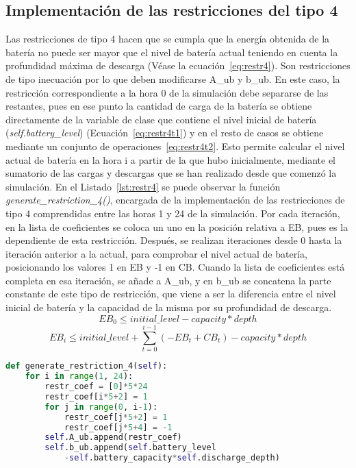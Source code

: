 \subsection{Implementación de las restricciones del tipo 4}
Las restricciones de tipo 4 hacen que se cumpla que la energía obtenida de la batería no puede ser mayor que el nivel de batería actual teniendo en cuenta la profundidad máxima de descarga (Véase la ecuación~\ref{eq:restr4}). Son restricciones de tipo inecuación por lo que deben modificarse A\_ub y b\_ub. En este caso, la restricción correspondiente a la hora 0 de la simulación debe separarse de las restantes, pues en ese punto la cantidad de carga de la batería se obtiene directamente de la variable de clase que contiene el nivel inicial de batería (\textit{self.battery\_level}) (Ecuación~\ref{eq:restr4t1}) y en el resto de casos se obtiene mediante un conjunto de operaciones~\ref{eq:restr4t2}. Esto permite calcular el nivel actual de batería en la hora i a partir de la que hubo inicialmente, mediante el sumatorio de las cargas y descargas que se han realizado desde que comenzó la simulación. En el Listado~\ref{lst:restr4} se puede observar la función \textit{generate\_restriction\_4()}, encargada de la implementación de las restricciones de tipo 4 comprendidas entre las horas 1 y 24 de la simulación. Por cada iteración, en la lista de coeficientes se coloca un uno en la posición relativa a EB, pues es la dependiente de esta restricción. Después, se realizan iteraciones desde 0 hasta la iteración anterior a la actual, para comprobar el nivel actual de batería, posicionando los valores 1 en EB y -1 en CB. Cuando la lista de coeficientes está completa en esa iteración, se añade a A\_ub, y en b\_ub se concatena la parte constante de este tipo de restricción, que viene a ser la diferencia entre el nivel inicial de batería y la capacidad de la misma por su profundidad de descarga.
\begin{equation}
  \label{eq:restr4t1}
  EB_{0} \leq initial\_level - capacity * depth
\end{equation}
\begin{equation}
  \label{eq:restr4t2}
  EB_{i} \leq initial\_level + \sum_{t=0}^{i-1}(-EB_{t}+CB_{t}) - capacity * depth
\end{equation}
\begin{lstlisting}[language=Python,float=ht,caption={Restricciones del tipo 4},label={lst:restr4}]
def generate_restriction_4(self):
    for i in range(1, 24):
        restr_coef = [0]*5*24
        restr_coef[i*5+2] = 1
        for j in range(0, i-1):
            restr_coef[j*5+2] = 1
            restr_coef[j*5+4] = -1
        self.A_ub.append(restr_coef)
        self.b_ub.append(self.battery_level
            -self.battery_capacity*self.discharge_depth)
\end{lstlisting}
